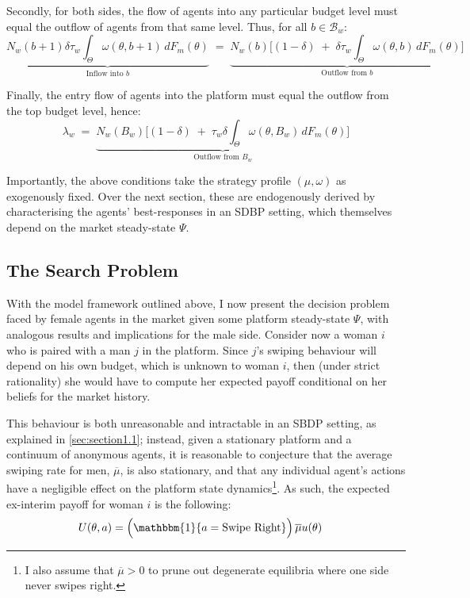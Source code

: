 Secondly, for both sides, the flow of agents into any particular budget level must equal the outflow of agents from that same level. Thus, for all $b\in\mathcal{B}_w$: 
\begin{equation}\label{eq:ss2} 
    \underbrace{N_w(b+1) \delta \tau_w \int_{\Theta} \omega(\theta,b+1)\,dF_{m}(\theta)}_{\text{Inflow into $b$}} \;=\; \underbrace{N_w(b) \Big[ (1-\delta) \;+\; \delta \tau_w\int_{\Theta} \omega(\theta,b)\,dF_{m}(\theta)\Big]}_{\text{Outflow from $b$}}
\end{equation}

Finally, the entry flow of agents into the platform must equal the outflow from the top budget level, hence: 
\begin{equation}\label{eq:ss3} 
    \lambda_w \;=\; \underbrace{N_w(B_w) \Big[ (1-\delta) \;+\; \tau_w \delta \int_{\Theta} \omega(\theta,B_w)\,dF_{m}(\theta) \Big]}_{\text{Outflow from $B_w$}}
\end{equation} 

Importantly, the above conditions take the strategy profile $(\mu,\omega)$ as exogenously fixed. Over the next section, these are endogenously derived by characterising the agents’ best-responses in an SDBP setting, which themselves depend on the market steady-state $\Psi$.

\subsection{The Search Problem}\label{sec:section2.3}
With the model framework outlined above, I now present the decision problem faced by female agents in the market given some platform steady-state $\Psi$, with analogous results and implications for the male side. 
Consider now a woman $i$ who is paired with a man $j$ in the platform. Since $j$'s swiping behaviour will depend on his own budget, which is unknown to woman $i$, then (under strict rationality) she would have to compute her expected payoff conditional on her beliefs for the market history. 

This behaviour is both unreasonable and intractable in an SBDP setting, as explained in \autoref{sec:section1.1}; instead, given a stationary platform and a continuum of anonymous agents, it is reasonable to conjecture that the average swiping rate for men, $\overline\mu$, is also stationary, and that any individual agent's actions have a negligible effect on the platform state dynamics\footnote{I also assume that $\overline\mu>0$ to prune out degenerate equilibria where one side never swipes right.}.
As such, the expected ex-interim payoff for woman $i$ is the following:
\begin{equation*}
    \begin{aligned}
        U(\theta, a)&=\Big(\mathbbm{1}\{a=\text{Swipe Right}\}\Big)\,\overline{\mu}u(\theta)%
    \end{aligned} 
\end{equation*} 

